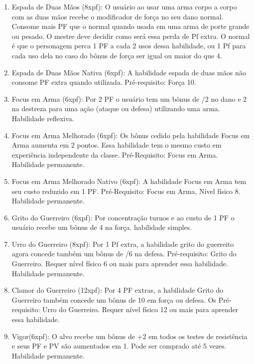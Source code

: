 \begin{enumerate}
	\item Espada de Duas Mãos (8xpf): O usuário ao usar uma arma corpo a corpo com as duas mãos recebe o modificador de força no seu dano normal. Consome mais PF que o normal quando usada em uma arma de porte grande ou pesado. O mestre deve decidir como será essa perda de Pf extra. O normal é que o personagem perca 1 PF a cada 2 usos dessa habilidade, ou 1 Pf para cada uso dela no caso do bônus de força ser igual ou maior do que 4. 

	\item Espada de Duas Mãos Nativa (6xpf): A habilidade espada de duas mãos não consome PF extra quando utilizada. Pré-requisito: Força 10. 

	\item Focus em Arma (6xpf): Por 2 PF o usuário tem um bônus de /2 no dano e 2 na destreza para uma ação (ataque ou defesa) utilizando uma arma. Habilidade reflexiva.

	\item Focus em Arma Melhorado (6xpf): Os bônus cedido pela habilidade Focus em Arma aumenta em 2 pontos. Essa habilidade tem o mesmo custo em experiência independente da classe. Pré-Requisito: Focus em Arma. Habilidade permanente.

	\item Focus em Arma Melhorado Nativo (6xpf): A habilidade Focus em Arma tem seu custo reduzido em 1 PF. Pré-Requisito: Focus em Arma, Nível físico 8. Habilidade permanente.

	\item Grito do Guerreiro (6xpf): Por concentração turnos e ao custo de 1 PF o usuário recebe um bônus de 4 na força. habilidade simples. 
	
	\item Urro do Guerreiro (8xpf): Por 1 Pf extra, a habilidade grito do guerreito agora concede também um bônus de /6 na defesa. Pré-requisito: Grito do Guerreiro. Requer nível físico 6 ou mais para aprender essa habilidade. Habilidade permanente.
		
	\item Clamor do Guerreiro (12xpf): Por 4 PF extras, a habilidade Grito do Guerreiro também concede um bônus de 10 em força ou defesa. Os  Pré-requisito: Urro do Guerreiro. Requer nível físico 12 ou mais para aprender essa habilidade.
		
	\item Vigor(6xpf): O alvo recebe um bônus de +2 em todos os testes de resistência e seus PF e PV são aumentados em 1. Pode ser comprado até 5 vezes. Habilidade permanente.


\end{enumerate}
